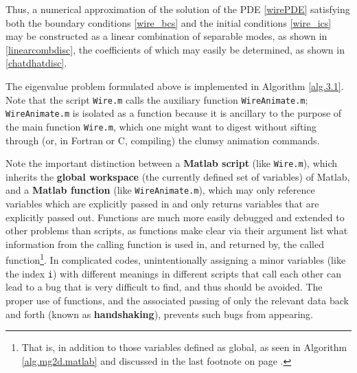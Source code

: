 Thus, a numerical approximation of the solution of the PDE \eqref{wirePDE} satisfying both the
boundary conditions \eqref{wire_bcs} and the initial conditions
\eqref{wire_ics} may be constructed as a linear combination of
separable modes, as shown in \eqref{linearcombdisc}, the coefficients
of which may easily be determined, as shown in \eqref{chatdhatdisc}.

\begin{figure*}[t!]
\end{figure*}

The eigenvalue problem formulated above is implemented in Algorithm \ref{alg.3.1}.
Note that the script {\tt Wire.m} calls the auxiliary function {\tt WireAnimate.m};
{\tt WireAnimate.m} is isolated as a function because it is ancillary to the purpose of the main function {\tt Wire.m},
which one might want to digest without sifting through (or, in Fortran or C, compiling) the clumsy animation commands.

Note the important distinction between a {\bf Matlab script} (like {\tt Wire.m}), which inherits the {\bf global
workspace} (the currently defined set of variables) of Matlab, and a
{\bf Matlab function} (like {\tt WireAnimate.m}), which may only reference variables which are explicitly
passed in and only returns variables that are explicitly passed out.
Functions are much more easily debugged and extended to other problems than scripts, as functions make clear via their argument list what information from
the calling function is used in, and returned by, the called function\footnote{That is, in addition to those variables defined as global,
as seen in Algorithm \ref{alg.mg2d.matlab} and discussed in the last footnote on page \pageref{sec.C.C.comparison}.}.
In complicated codes, unintentionally assigning a minor variables (like the index {\tt i}) with different meanings in different scripts that call each other
can lead to a bug that is very difficult to find, and thus should be avoided.
The proper use of functions, and the associated passing of only the relevant data back and forth (known as {\bf handshaking}), prevents such bugs from appearing.

